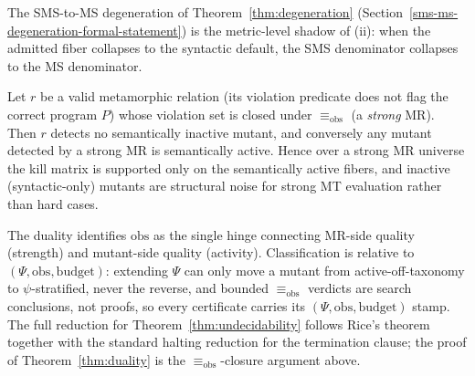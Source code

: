 \documentclass[manuscript,screen,review]{acmart}
\begin{document}
The SMS-to-MS degeneration of
Theorem~\ref{thm:degeneration} (Section~\ref{sms-ms-degeneration-formal-statement}) is the metric-level shadow of (ii): when the admitted
fiber collapses to the syntactic default, the SMS denominator collapses
to the MS denominator.

\begin{theorem}\label{thm:duality}
Let $r$ be a valid
metamorphic relation (its violation predicate does not flag the correct
program $P$) whose violation set is closed under $\equiv_{\mathrm{obs}}$
(a \emph{strong} MR). Then $r$ detects no semantically inactive
mutant, and conversely any mutant detected by a strong MR is
semantically active. Hence over a strong MR universe the kill matrix
is supported only on the semantically active fibers, and inactive
(syntactic-only) mutants are structural noise for strong MT evaluation
rather than hard cases.
\end{theorem}

The duality identifies $\mathrm{obs}$ as the single hinge connecting MR-side
quality (strength) and mutant-side quality (activity). Classification
is relative to $(\Psi, \mathrm{obs}, \text{budget})$: extending $\Psi$ can only move
a mutant from active-off-taxonomy to $\psi$-stratified, never the
reverse, and bounded $\equiv_{\mathrm{obs}}$ verdicts are search conclusions,
not proofs, so every certificate carries its $(\Psi, \mathrm{obs}, \text{budget})$
stamp. The full reduction for Theorem~\ref{thm:undecidability} follows Rice's theorem together
with the standard halting reduction for the termination clause; the
proof of Theorem~\ref{thm:duality} is the $\equiv_{\mathrm{obs}}$-closure argument above.
\end{document}
